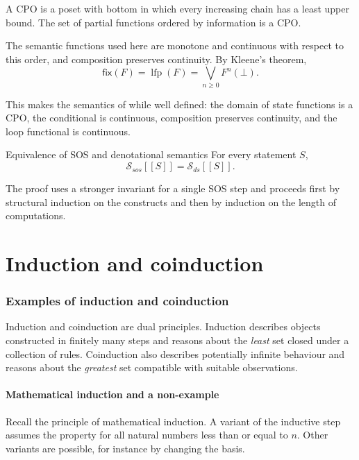 \documentclass[a4paper]{article}
\newcommand{\fix}{\mathsf{fix}}
\newcommand{\sem}[1]{[\![#1]\!]}
\newcommand{\lfp}{\operatorname{lfp}}
\begin{document}
A CPO is a poset with bottom in which every increasing chain has a least upper bound.
The set of partial functions ordered by information is a CPO.

The semantic functions used here are monotone and continuous with respect to this order, and composition preserves continuity.
By Kleene's theorem,
\[
    \fix(F)
    =
    \lfp(F)
    =
    \bigvee_{n\geq0}F^n(\bot).
\]

This makes the semantics of while well defined: the domain of state functions is a CPO, the conditional is continuous, composition preserves continuity, and the loop functional is continuous.

\begin{snippettheorem}{Equivalence of SOS and denotational semantics}
    For every statement \(S\),
    \[
        \mathcal S_{sos}\sem{S}
        =
        \mathcal S_{ds}\sem{S}.
    \]
\end{snippettheorem}

The proof uses a stronger invariant for a single SOS step and proceeds first by structural induction on the constructs and then by induction on the length of computations.

\pagebreak
\part{Induction and coinduction}

\section{Examples of induction and coinduction}

Induction and coinduction are dual principles.
Induction describes objects constructed in finitely many steps and reasons about the \emph{least} set closed under a collection of rules.
Coinduction also describes potentially infinite behaviour and reasons about the \emph{greatest} set compatible with suitable observations.

\subsection{Mathematical induction and a non-example}

Recall the principle of mathematical induction. A variant of the inductive step assumes the property for all natural numbers less than or equal to \(n\).
Other variants are possible, for instance by changing the basis.
\end{document}
